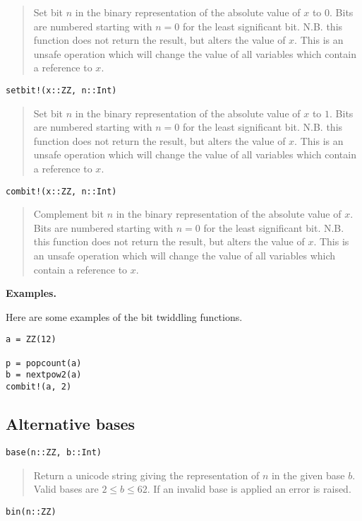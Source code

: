 \documentclass[a4paper,10pt]{article}
\newcommand{\desc}[1]{\vspace{-3mm}\begin{quote}#1\end{quote}}
\begin{document}
{{{{{{\desc{Set bit $n$ in the binary representation of the absolute value of $x$ to $0$. Bits
are numbered starting with $n = 0$ for the least significant bit. N.B. this function does
not return the result, but alters the value of $x$. This is an unsafe operation which will
change the value of all variables which contain a reference to $x$.}

\begin{lstlisting}
setbit!(x::ZZ, n::Int)
\end{lstlisting}

\desc{Set bit $n$ in the binary representation of the absolute value of $x$ to $1$. Bits
are numbered starting with $n = 0$ for the least significant bit. N.B. this function does
not return the result, but alters the value of $x$. This is an unsafe operation which will
change the value of all variables which contain a reference to $x$.}

\begin{lstlisting}
combit!(x::ZZ, n::Int)
\end{lstlisting}

\desc{Complement bit $n$ in the binary representation of the absolute value of $x$. Bits
are numbered starting with $n = 0$ for the least significant bit. N.B. this function does
not return the result, but alters the value of $x$. This is an unsafe operation which will
change the value of all variables which contain a reference to $x$.}

\textbf{Examples.}

Here are some examples of the bit twiddling functions.

\begin{lstlisting}
a = ZZ(12)

p = popcount(a)
b = nextpow2(a)
combit!(a, 2)
\end{lstlisting}

\subsection{Alternative bases}

\begin{lstlisting}
base(n::ZZ, b::Int)
\end{lstlisting}

\desc{Return a unicode string giving the representation of $n$ in the given base $b$. Valid
bases are $2 \leq b \leq 62$. If an invalid base is applied an error is raised.}

\begin{lstlisting}
bin(n::ZZ)
\end{lstlisting}

}}}}}}
\end{document}
